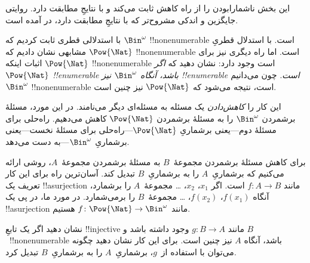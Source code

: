 \documentclass[../../../include/open-logic-section]{subfiles}
\begin{document}


\begin{editorial}
  این بخش ناشمارابودن را از راه کاهش ثابت می‌کند و با نتایجِ
   مطابقت دارد. روایتی جایگزین و اندکی مشروح‌تر که
  با نتایجِ  مطابقت دارد، در  آمده است.
\end{editorial}

با استدلالی قطری ثابت کردیم که $\Bin^\omega$ !!{nonenumerable} است.
با استدلال قطریِ مشابهی نشان دادیم که $\Pow{\Nat}$ !!{nonenumerable}
است. اما راه دیگری نیز برای اثبات اینکه $\Pow{\Nat}$
!!{nonenumerable} است وجود دارد: نشان دهید که \emph{اگر
$\Pow{\Nat}$ !!{enumerable} باشد، آنگاه $\Bin^\omega$ نیز
!!{enumerable} است}. چون می‌دانیم $\Bin^\omega$ !!{nonenumerable} است،
نتیجه می‌شود که $\Pow{\Nat}$ نیز چنین است.

این کار را \emph{کاهش‌دادن} یک مسئله به مسئله‌ای دیگر می‌نامند. در این
مورد، مسئلهٔ برشمردن $\Bin^\omega$ را به مسئلهٔ برشمردن
$\Pow{\Nat}$ کاهش می‌دهیم. راه‌حلی برای مسئلهٔ دوم---یعنی برشماریِ
$\Pow{\Nat}$---راه‌حلی برای مسئلهٔ نخست---یعنی برشماریِ
$\Bin^\omega$---به دست می‌دهد.

برای کاهش مسئلهٔ برشمردن مجموعهٔ~$B$ به مسئلهٔ برشمردن مجموعهٔ~$A$،
روشی ارائه می‌کنیم که برشماریِ~$A$ را به برشماریِ~$B$ تبدیل کند.
آسان‌ترین راه برای این کار تعریف یک !!a{surjection} مانند
$f\colon A \to B$ است. اگر $x_1$، $x_2$، \dots{} مجموعهٔ~$A$ را
برشمارد، آنگاه $f(x_1)$، $f(x_2)$، \dots{} مجموعهٔ~$B$ را برمی‌شمارد.
در مورد ما، در پی یک !!a{surjection} مانند $f\colon \Pow{\Nat}
\to \Bin^\omega$ هستیم.

\begin{prob}
نشان دهید اگر یک تابعِ !!{injective} مانند $g\colon B \to A$ وجود داشته
باشد و $B$~!!{nonenumerable} باشد، آنگاه $A$ نیز چنین است. برای این کار
نشان دهید چگونه می‌توان با استفاده از~$g$، برشماریِ~$A$ را به برشماریِ~$B$
تبدیل کرد.
\end{prob}
\end{document}

